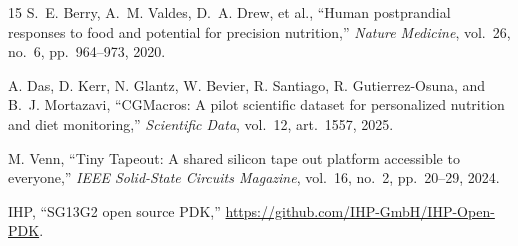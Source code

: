 \documentclass[conference]{IEEEtran}
\begin{document}
\begin{thebibliography}{15}
S.~E. Berry, A.~M. Valdes, D.~A. Drew, et al., ``Human postprandial responses
to food and potential for precision nutrition,'' \emph{Nature Medicine},
vol.~26, no.~6, pp.~964--973, 2020.

A. Das, D. Kerr, N. Glantz, W. Bevier, R. Santiago, R. Gutierrez-Osuna, and
B.~J. Mortazavi, ``CGMacros: A pilot scientific dataset for personalized
nutrition and diet monitoring,'' \emph{Scientific Data}, vol.~12, art.~1557,
2025.

M. Venn, ``Tiny Tapeout: A shared silicon tape out platform accessible to
everyone,'' \emph{IEEE Solid-State Circuits Magazine}, vol.~16, no.~2,
pp.~20--29, 2024.

IHP, ``SG13G2 open source PDK,''
\url{https://github.com/IHP-GmbH/IHP-Open-PDK}.

\end{thebibliography}
\end{document}
